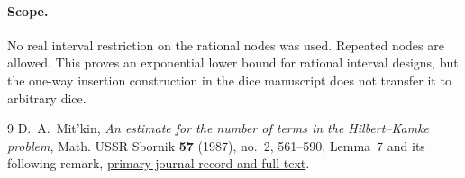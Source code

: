 \documentclass[11pt]{article}
\begin{document}
\paragraph{Scope.}
No real interval restriction on the rational nodes was used. Repeated nodes
are allowed. This proves an exponential lower bound for rational interval
designs, but the one-way insertion construction in the dice manuscript does
not transfer it to arbitrary dice.
\begin{thebibliography}{9}
 D.~A.~Mit'kin, \emph{An estimate for the number of terms in the Hilbert--Kamke problem}, Math. USSR Sbornik \textbf{57} (1987), no.~2, 561--590, Lemma~7 and its following remark, \href{https://www.mathnet.ru/eng/sm1845}{primary journal record and full text}.
\end{thebibliography}
\end{document}
